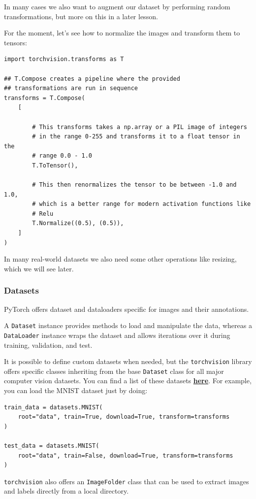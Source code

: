 In many cases we also want to augment our dataset by performing random transformations, but more on this in a later lesson. \newline

For the moment, let's see how to normalize the images and transform them to tensors:
\begin{lstlisting}
import torchvision.transforms as T

## T.Compose creates a pipeline where the provided
## transformations are run in sequence
transforms = T.Compose(
    [

        # This transforms takes a np.array or a PIL image of integers
        # in the range 0-255 and transforms it to a float tensor in the
        # range 0.0 - 1.0
        T.ToTensor(),

        # This then renormalizes the tensor to be between -1.0 and 1.0,
        # which is a better range for modern activation functions like
        # Relu
        T.Normalize((0.5), (0.5)),
    ]
)
\end{lstlisting}
In many real-world datasets we also need some other operations like resizing, which we will see later.

\subsubsection{Datasets}

PyTorch offers dataset and dataloaders specific for images and their annotations.\newline

A \verb|Dataset| instance provides methods to load and manipulate the data, whereas a \verb|DataLoader| instance wraps the dataset and allows iterations over it during training, validation, and test. \newline

It is possible to define custom datasets when needed, but the \verb|torchvision| library offers specific classes inheriting from the base \verb|Dataset| class for all major computer vision datasets. You can find a list of these datasets \href{https://pytorch.org/vision/stable/datasets.html\#image-classification}{\textbf{here}}. For example, you can load the MNIST dataset just by doing:
\begin{lstlisting}
train_data = datasets.MNIST(
    root="data", train=True, download=True, transform=transforms
)

test_data = datasets.MNIST(
    root="data", train=False, download=True, transform=transforms
)
\end{lstlisting}
\verb|torchvision| also offers an \verb|ImageFolder| class that can be used to extract images and labels directly from a local directory.

